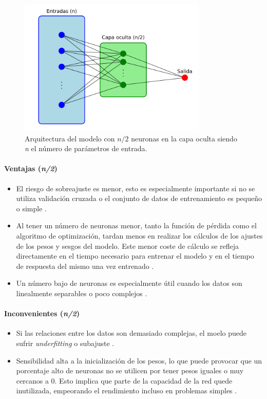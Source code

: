 \begin{figure}[H]
    \centering
    \includegraphics[width=0.8\textwidth]{./img/modelo/arquitecturas/arqnmediosBIN.pdf}
    \caption{Arquitectura del modelo con $n/2$ neuronas en la capa oculta siendo \textit{n} el número de parámetros de entrada.}
    \label{fig:arqnmediosBIN}
\end{figure}

\paragraph{Ventajas (\textit{n/2})}
\begin{itemize}
	\item El riesgo de sobreajuste es menor, esto es especialmente importante si no se utiliza validación cruzada o el conjunto de datos de entrenamiento es pequeño o simple \cite{chollet2017deep}.
	\item  Al tener un número de neuronas menor, tanto la función  de pérdida como el algoritmo de optimización, tardan menos en realizar los cálculos de los ajustes de los pesos y sesgos del modelo. Este menor coste de cálculo se refleja directamente en el tiempo necesario para entrenar el modelo y en el tiempo de respuesta del mismo una vez entrenado \cite{goodfellow2016deep}.
	\item Un número bajo de neuronas es especialmente útil cuando los datos son linealmente separables o poco complejos \cite{ruck1996hidden}.
\end{itemize}
\paragraph{Inconvenientes (\textit{n/2})}
\begin{itemize}
	\item Si las relaciones entre los datos son demasiado complejas, el moelo puede sufrir \textit{underfitting} o subajuste \cite{goodfellow2016deep}.
	\item Sensibilidad alta a la inicialización de los pesos, lo que puede provocar que un porcentaje alto de neuronas no se utilicen por tener pesos iguales o muy cercanos a 0. Esto implica que parte de la capacidad de la red quede inutilizada, empeorando el rendimiento incluso en problemas simples \cite{glorot2010understanding}.
\end{itemize}

